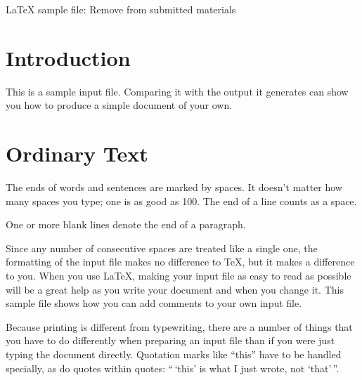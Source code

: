 

\LaTeX\xspace sample file:  {\color{red} Remove from submitted materials}

\section{Introduction}
This is a sample input file.  Comparing it with the output it
generates can show you how to produce a simple document of
your own.

\section{Ordinary Text}  %

The ends  of words and sentences are marked 
  by   spaces. It  doesn't matter how many 
spaces    you type; one is as good as 100.  The
end of   a line counts as a space.

One   or more   blank lines denote the  end 
of  a paragraph.  

Since any number of consecutive spaces are treated like a single
one, the formatting of the input file makes no difference to
      \TeX,         %
but it makes a difference to you.  
When you use
      \LaTeX,       %
making your input file as easy to read as possible
will be a great help as you write your document and when you
change it.  This sample file shows how you can add comments to
your own input file.

Because printing is different from typewriting, there are a 
number of things that you have to do differently when preparing 
an input file than if you were just typing the document directly.  
Quotation marks like 
       ``this'' 
have to be handled specially, as do quotes within quotes: 
       ``\,`this'                  %
        is what I just 
        wrote, not  `that'\,''.  

